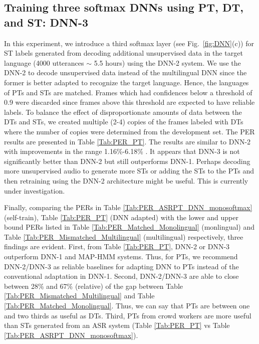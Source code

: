 \documentclass[a4paper]{article}
\begin{document}
\subsection{Training three softmax DNNs using PT, DT, and ST: DNN-3} \vspace{-2mm}
\label{sec:Effect of training three softmax DNNs using crowdsourced PT, multilingual DT, and unsupervised data}
In this experiment, we introduce a third softmax layer (see Fig.~\ref{fig:DNN}(c)) for ST labels generated from decoding additional unsupervised data in the target language (4000 utterances $\sim$ 5.5 hours) using the DNN-2 system. We use the DNN-2 to decode unsupervised data instead of the multilingual DNN since the former is better adapted to recognize the target language. Hence, the languages of PTs and STs are matched. Frames which had confidences below a threshold of 0.9 were discarded since frames above this threshold are expected to have reliable labels. To balance the effect of disproportionate amounts of data between the DTs and STs, we created multiple (2-4) copies of the frames labeled with DTs where the number of copies were determined from the development set. The PER results are presented in Table \ref{Tab:PER_PT}. The results are similar to DNN-2 with improvements in the range 1.16\%-6.18\% . It appears that DNN-3 is not significantly better than DNN-2 but still outperforms DNN-1. Perhaps decoding more unsupervised audio to generate more STs or adding the STs to the PTs and then retraining using the DNN-2 architecture might be useful. This is currently under investigation.


Finally, comparing the PERs in Table \ref{Tab:PER_ASRPT_DNN_monosoftmax} (self-train), Table \ref{Tab:PER_PT} (DNN adapted) with the lower and upper bound PERs listed in Table \ref{Tab:PER_Matched_Monolingual} (monlingual) and Table \ref{Tab:PER_Mismatched_Multilingual} (multilingual) respectively, three findings are evident. %
First, from Table \ref{Tab:PER_PT}, DNN-2 or DNN-3 outperform DNN-1 and MAP-HMM systems. Thus, for PTs, we recommend DNN-2/DNN-3 as reliable baselines for adapting DNN to PTs instead of the conventional adaptation in DNN-1. Second, DNN-2/DNN-3 are able to close between 28\% and 67\% (relative) of the gap between Table \ref{Tab:PER_Mismatched_Multilingual} and Table \ref{Tab:PER_Matched_Monolingual}. Thus, we can say that PTs are between one and two thirds as useful as DTs. Third, PTs from crowd workers are more useful than STs generated from an ASR system (Table \ref{Tab:PER_PT} vs Table \ref{Tab:PER_ASRPT_DNN_monosoftmax}).
\end{document}
